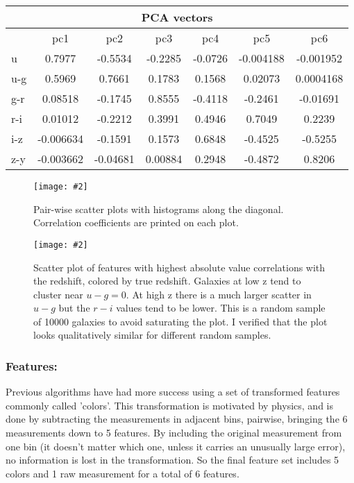 \documentclass[13pt]{amsart}
\newcommand{\figscale}[4]{
\begin{figure}[h]
    \centering
    \caption{#3}
    \label{#4}
    \texttt{[image: \#2]}
\end{figure}
}
\begin{document}
    \begin{center}
    \begin{tabular}{|l|c|c|c|c|c|c|}
      \multicolumn{7}{c}{PCA vectors} \\ \hline
      & pc1 & pc2 & pc3 & pc4 & pc5 & pc6 \\ \hline
      u &  0.7977 & -0.5534 & -0.2285 & -0.0726 & -0.004188 & -0.001952 \\ \hline
      u-g &  0.5969 & 0.7661 & 0.1783 & 0.1568 & 0.02073 & 0.0004168 \\ \hline
      g-r &  0.08518 & -0.1745 & 0.8555 & -0.4118 & -0.2461 & -0.01691 \\ \hline
      r-i &  0.01012 & -0.2212 & 0.3991 & 0.4946 & 0.7049 & 0.2239 \\ \hline
      i-z &  -0.006634 & -0.1591 & 0.1573 & 0.6848 & -0.4525 & -0.5255 \\ \hline
      z-y &  -0.003662 & -0.04681 & 0.00884 & 0.2948 & -0.4872 & 0.8206 \\ \hline
    \end{tabular}
    \end{center}

    \figscale{1}{../data/corrplot.png}{Pair-wise scatter plots with histograms along the diagonal. Correlation coefficients are printed on each plot.}{fig:corrplot}

    \figscale{1}{../data/top2features_coloredby_z.png}{Scatter plot of features with highest absolute value correlations with the redshift, colored by true redshift. Galaxies at low z tend to cluster near $u-g=0$. At high z there is a much larger scatter in $u-g$ but the $r-i$ values tend to be lower. This is a random sample of 10000 galaxies to avoid saturating the plot. I verified that the plot looks qualitatively similar for different random samples.}{fig:topfeatures}



    \subsubsection{Features:}

      Previous algorithms have had more success using a set of transformed features commonly called 'colors'. This transformation is motivated by physics, and is done by subtracting the measurements in adjacent bins, pairwise, bringing the 6 measurements down to 5 features. By including the original measurement from one bin (it doesn't matter which one, unless it carries an unusually large error), no information is lost in the transformation. So the final feature set includes 5 colors and 1 raw measurement for a total of 6 features.
\end{document}
